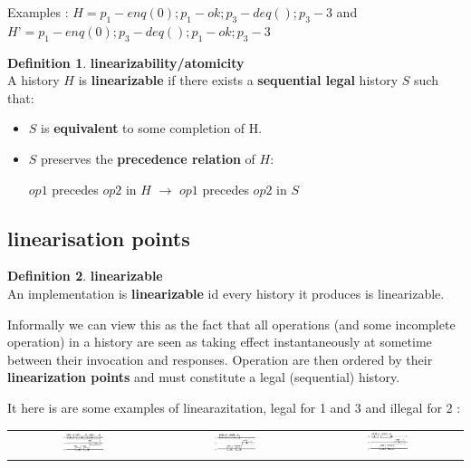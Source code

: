 \documentclass{article}
\theoremstyle{definition}
\newtheorem{definition}{Definition}[section]
\begin{document}
Examples : $H=p_1-enq(0); p_1-ok; p_3-deq(); p_3-3$ and $H’=p_1-enq(0); p_3-deq(); p_1-ok; p_3-3$

\begin{definition}\textbf{linearizability/atomicity}\\
A history $H$ is \textbf{linearizable} if there exists a \textbf{sequential legal} history $S$ such that:
\begin{itemize}
\item $S$ is \textbf{equivalent} to some completion of H.
\item $S$ preserves the \textbf{precedence relation} of $H$:
\begin{center}
$op1$ precedes $op2$ in $H$ $\rightarrow$ $op1$ precedes $op2$ in $S$
\end{center}
\end{itemize}
\end{definition}

\subsection{linearisation points}

\begin{definition}\textbf{linearizable}\\
An implementation is \textbf{linearizable} id every history it produces is linearizable.
\end{definition}

Informally we can view this as the fact that all operations (and some incomplete operation) in a history are seen as taking effect instantaneously at sometime between their invocation and responses. Operation are then ordered by their \textbf{linearization points} and must constitute a legal (sequential) history.

It here is are some examples of linearazitation, legal for 1 and 3 and illegal for 2 :
\begin{center}
\begin{tabular}{c c c}
\includegraphics[width=0.3\textwidth]{linear_1}&
\includegraphics[width=0.3\textwidth]{linear_2}&
\includegraphics[width=0.3\textwidth]{linear_3}
\end{tabular}
\end{center}
\end{document}
